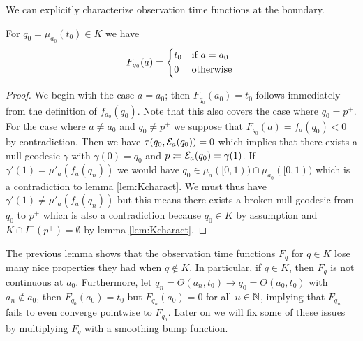 We can explicitly characterize observation time functions at the boundary.
\begin{lemma}\label{lem:boundaryF}
    For $q_0=\mu_{a_0}(t_0)\in K$ we have 
    \begin{equation*}
        F_{q_0}(a) = 
        \begin{cases*}
            t_0 & if $a=a_0$ \\
            0 & otherwise
        \end{cases*}
    \end{equation*}
\end{lemma}
\begin{proof}
    We begin with the case $a=a_0$; then $F_{q_0}(a_0)=t_0$ follows immediately from the definition of $f_{a_0}(q_0)$. Note that this also covers the case where $q_0=p^+$. For the case where $a\neq a_0$ and $q_0\neq p^+$ we suppose that $F_{q_0}(a)=f_a(q_0)<0$ by contradiction. Then we have $\tau(q_0,{\mathcal{E}}_a(q_0))=0$ which implies that there exists a null geodesic $\gamma$ with $\gamma(0)=q_0$ and $p\coloneqq {\mathcal{E}}_a(q_0)=\gamma(1)$. If $\gamma'(1)=\mu'_a(f_a(q_n))$ we would have $q_0\in \mu_a([0,1)) \cap \mu_{a_0}([0,1))$ which is a contradiction to lemma \ref{lem:Kcharact}. We must thus have $\gamma'(1)\neq\mu'_a(f_a(q_n))$ but this means there exists a broken null geodesic from $q_0$ to $p^+$ which is also a contradiction because $q_0\in K$ by assumption and $K\cap I^-(p^+)=\emptyset$ by lemma \ref{lem:Kcharact}.
\end{proof}
\begin{remark}
    The previous lemma shows that the observation time functions $F_q$ for $q\in K$ lose many nice properties they had when $q\notin K$. In particular, if $q\in K$, then $F_q$ is not continuous at $a_0$. Furthermore, let $q_n=\Theta(a_n,t_0)\to q_0=\Theta(a_0,t_0)$ with $a_n \notin a_0$, then $F_{q_0}(a_0)=t_0$ but $F_{q_n}(a_0)=0$ for all $n\in \mathbb{N}$, implying that $F_{q_n}$ fails to even converge pointwise to $F_{q_0}$. Later on we will fix some of these issues by multiplying $F_q$ with a smoothing bump function.
\end{remark}

